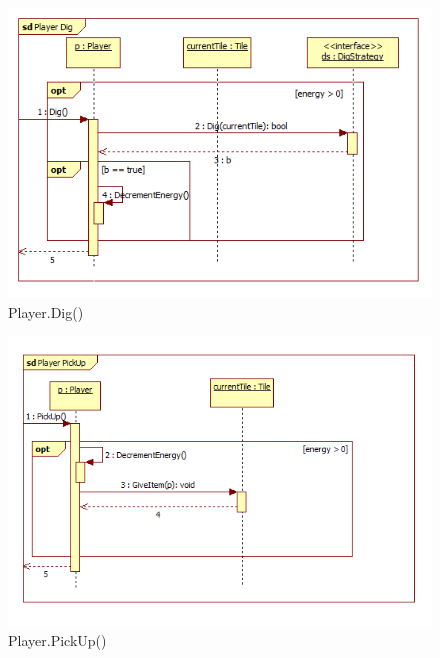 \begin{figure}[H]
	\begin{center}
		\includegraphics[width=15cm]{chapters/chapter03/seqdiag/Player_Dig.png}
		\caption{Player.Dig()}
		\label{fig:PlayerDig}
	\end{center}
\end{figure}
\begin{figure}[H]
	\begin{center}
		\includegraphics[width=15cm]{chapters/chapter03/seqdiag/Player_PickUp.png}
		\caption{Player.PickUp()}
		\label{fig:PlayerPickUp}
	\end{center}
\end{figure}
